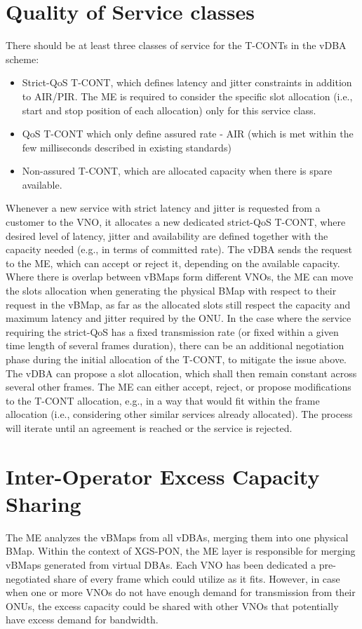 \section{Quality of Service classes} There should be at least three classes of service for the \acp{T-CONT} in the \ac{vDBA} scheme:
\begin{itemize}
    \item Strict-\ac{QoS} \ac{T-CONT}, which defines latency and jitter constraints in addition to AIR/PIR. The \ac{ME} is required to consider the specific slot allocation (i.e., start and stop position of each allocation) only for this service class.
    \item \ac{QoS} \ac{T-CONT} which only define assured rate - AIR (which is met within the few milliseconds described in existing standards) 
    \item Non-assured \ac{T-CONT}, which are allocated capacity when there is spare available.
\end{itemize}

 Whenever a new service with strict latency and jitter is requested from a customer to the \ac{VNO}, it allocates a new dedicated strict-\ac{QoS} \ac{T-CONT}, where desired level of latency, jitter and availability are defined together with the capacity needed (e.g., in terms of committed rate). The \ac{vDBA} sends the request to the \ac{ME}, which can accept or reject it, depending on the available capacity. Where there is overlap between \acp{vBMap} form different \acp{VNO}, the \ac{ME} can move the slots allocation when generating the physical \ac{BMap} with respect to their request in the \ac{vBMap}, as far as the allocated slots still respect the capacity and maximum latency and jitter required by the \ac{ONU}. In the case where the service requiring the strict-\ac{QoS} has a fixed transmission rate (or fixed within a given time length of several frames duration), there can be an additional negotiation phase during the initial allocation of the \ac{T-CONT}, to mitigate the issue above. The \ac{vDBA} can propose a slot allocation, which shall then remain constant across several other frames. The \ac{ME} can either accept, reject, or propose modifications to the \ac{T-CONT} allocation, e.g., in a way that would fit within the frame allocation (i.e., considering other similar services already allocated). The process will iterate until an agreement is reached or the service is rejected.



\section{Inter-Operator Excess Capacity Sharing}
The \ac{ME} analyzes the \acp{vBMap} from all \acp{vDBA}, merging them into one physical \ac{BMap}. Within the context of XGS-PON, the \ac{ME} layer is responsible for merging \acp{vBMap} generated from virtual \acp{DBA}. Each \ac{VNO} has been dedicated a pre-negotiated share of every frame which could utilize as it fits. However, in case when one or more \acp{VNO} do not have enough demand for transmission from their \acp{ONU}, the excess capacity could be shared with other \acp{VNO} that potentially have excess demand for bandwidth.

